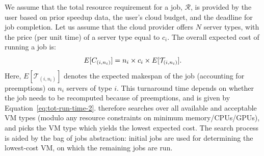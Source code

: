 We assume that the total resource requirement for a job, $\mathcal{R}$, is provided by the user based on prior speedup data, the user's cloud budget, and the deadline for job completion.
Let us assume that the cloud provider offers $N$ server types, with the price (per unit time) of a server type equal to $c_i$. 
The overall expected cost of running a job is: 
\begin{equation}
  \label{eq:e-cost}
\vspace*{\eqnspace}
  E[C_{( i,n_i )}] = n_i\times c_i \times E[\mathcal{T}_{( i,n_i )}].
\end{equation}
Here, $E[\mathcal{T}_{( i,n_i )}]$ denotes the expected makespan of the job (accounting for preemptions) on $n_i$ servers of type $i$. 
%
This turnaround time depends on whether the job needs to be recomputed because of preemptions, and is given by Equation~\ref{eq:tot-run-time-2}. 
%
\sysname therefore searches over all available and acceptable VM types (modulo any resource constraints on minimum memory/CPUs/GPUs), and picks the VM type which yields the lowest expected cost.
The search process is aided by the bag of jobs abstraction: initial jobs are used for determining the lowest-cost VM, on which the remaining jobs are run. 









